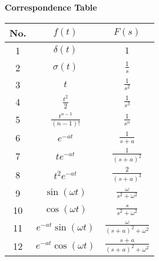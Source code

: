 \begin{center}
	{\bf\large Correspondence Table}
\end{center}
%
\begin{table}[h!]
\centering
\setlength{\extrarowheight}{0.43cm} 
\begin{tabular}{|c|c|c|} \hline
	No. & $\displaystyle f(t)$ 					& $\displaystyle F(s)$
			\tabularnewline [0.4cm] \hline 
	1   & $\displaystyle \delta(t)$ 		& $\displaystyle 1$
			\tabularnewline [0.4cm] \hline
	2 	& $\displaystyle \sigma(t)$ 		& $\displaystyle \frac{1}{s}$
			\tabularnewline [0.4cm] \hline
	3 	& $\displaystyle t$ 						& $\displaystyle \frac{1}{s^2}$
			\tabularnewline [0.4cm] \hline
	4 	& $\displaystyle \frac{t^2}{2}$ & $\displaystyle \frac{1}{s^3}$
			\tabularnewline [0.4cm] \hline
	5 	& $\displaystyle \frac{t^{n-1}}{(n-1)!}$ & $\displaystyle \frac{1}{s^n}$ 
			\tabularnewline [0.4cm] \hline
	6 	& $\displaystyle e^{-at}$ 			& $\displaystyle \frac{1}{s+a}$
			\tabularnewline [0.4cm] \hline
	7 	& $\displaystyle t e^{-at}$ 		& $\displaystyle \frac{1}{(s+a)^2}$
			\tabularnewline [0.4cm] \hline
	8 	& $\displaystyle t^2 e^{-at}$ 	& $\displaystyle	\frac{2}{(s+a)^3}$
			\tabularnewline [0.4cm] \hline
	9 	& $\displaystyle \sin(\omega t)$ & $\displaystyle \frac{\omega}{s^2 + \omega^2}$
			\tabularnewline [0.4cm] \hline
	10 	& $\displaystyle \cos(\omega t)$ & $\displaystyle \frac{s}{s^2 + \omega^2}$
			\tabularnewline [0.4cm] \hline
	11 	& $\displaystyle e^{-at} \sin(\omega t)$ & $\displaystyle \frac{\omega}{(s+a)^2 + \omega^2}$
			\tabularnewline [0.4cm] \hline
	12 	& $\displaystyle e^{-at} \cos(\omega t)$ & $\displaystyle \frac{s+a}{(s+a)^2 + \omega^2}$
			\tabularnewline [0.4cm] \hline
\end{tabular}
\end{table}
